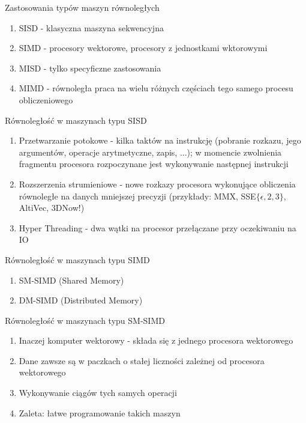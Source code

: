 \documentclass{beamer}
\begin{document}
\begin{frame}{Zastosowania typów maszyn równoległych}
  \begin{enumerate}
  \item SISD - klasyczna maszyna sekwencyjna
  \item SIMD - procesory wektorowe, procesory z jednostkami wktorowymi
  \item MISD - tylko specyficzne zastosowania
  \item MIMD - równoległa praca na wielu różnych częściach tego samego procesu obliczeniowego
  \end{enumerate}
\end{frame}

\begin{frame}{Równoległość w maszynach typu SISD}
  \begin{enumerate}
  \item Przetwarzanie potokowe - kilka taktów na instrukcję (pobranie rozkazu, jego argumentów, operacje arytmetyczne, zapis, ...); w momencie zwolnienia fragmentu procesora rozpoczynane jest wykonywanie następnej instrukcji
  \item Rozszerzenia strumieniowe - nowe rozkazy procesora wykonujące obliczenia równoległe na danych mniejszej precyzji (przykłady: MMX, SSE$\{\epsilon,2,3\}$, AltiVec, 3DNow!)
  \item Hyper Threading - dwa wątki na procesor przełączane przy oczekiwaniu na IO
  \end{enumerate}
\end{frame}

\begin{frame}{Równoległość w maszynach typu SIMD}
  \begin{enumerate}
  \item SM-SIMD (Shared Memory)
  \item DM-SIMD (Distributed Memory)
  \end{enumerate}
\end{frame}

\begin{frame}{Równoległość w maszynach typu SM-SIMD}
  \begin{enumerate}
  \item Inaczej komputer wektorowy - składa się z jednego procesora wektorowego
  \item Dane zawsze są w paczkach o stałej liczności zależnej od procesora wektorowego
  \item Wykonywanie ciągów tych samych operacji
  \item Zaleta: łatwe programowanie takich maszyn
  \end{enumerate}
\end{frame}
\end{document}
